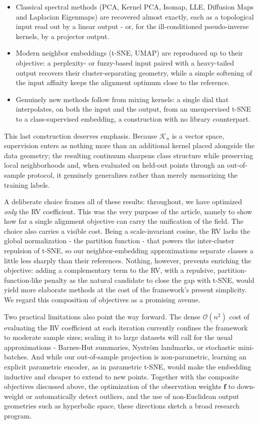 \documentclass[11pt]{article}
\begin{document}
	\begin{itemize}
		\item Classical spectral methods (PCA, Kernel PCA, Isomap, LLE, Diffusion Maps and Laplacian Eigenmaps) are recovered almost exactly, each as a topological input read out by a linear output - or, for the ill-conditioned pseudo-inverse kernels, by a projector output.
		\item Modern neighbor embeddings (t-SNE, UMAP) are reproduced up to their objective: a perplexity- or fuzzy-based input paired with a heavy-tailed output recovers their cluster-separating geometry, while a simple softening of the input affinity keeps the alignment optimum close to the reference.
		\item Genuinely new methods follow from mixing kernels: a single dial that interpolates, on both the input and the output, from an unsupervised t-SNE to a class-supervised embedding, a construction with no library counterpart.
	\end{itemize}
	
	This last construction deserves emphasis. Because $\mathcal{K}_n$ is a vector space, supervision enters as nothing more than an additional kernel placed alongside the data geometry; the resulting continuum sharpens class structure while preserving local neighborhoods and, when evaluated on held-out points through an out-of-sample protocol, it genuinely generalizes rather than merely memorizing the training labels.

	A deliberate choice frames all of these results: throughout, we have optimized \emph{only} the RV coefficient. This was the very purpose of the article, namely to show how far a single alignment objective can carry the unification of the field. The choice also carries a visible cost. Being a scale-invariant cosine, the RV lacks the global normalization - the partition function - that powers the inter-cluster repulsion of t-SNE, so our neighbor-embedding approximations separate classes a little less sharply than their references. Nothing, however, prevents enriching the objective: adding a complementary term to the RV, with a repulsive, partition-function-like penalty as the natural candidate to close the gap with t-SNE, would yield more elaborate methods at the cost of the framework's present simplicity. We regard this composition of objectives as a promising avenue.
	
	Two practical limitations also point the way forward. The dense $\mathcal{O}(n^2)$ cost of evaluating the RV coefficient at each iteration currently confines the framework to moderate sample sizes; scaling it to large datasets will call for the usual approximations - Barnes-Hut summaries, Nyström landmarks, or stochastic mini-batches. And while our out-of-sample projection is non-parametric, learning an explicit parametric encoder, as in parametric t-SNE, would make the embedding inductive and cheaper to extend to new points. Together with the composite objectives discussed above, the optimization of the observation weights $\mathbf{f}$ to down-weight or automatically detect outliers, and the use of non-Euclidean output geometries such as hyperbolic space, these directions sketch a broad research program.
\end{document}
